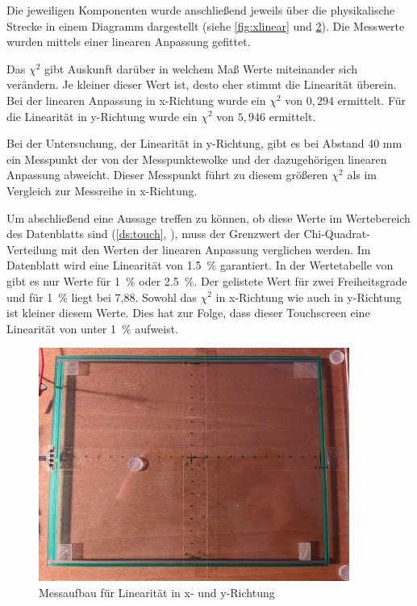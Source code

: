 Die jeweiligen Komponenten wurde anschließend jeweils über die physikalische Strecke in einem Diagramm dargestellt (siehe \cref{fig:xlinear} und \cref{fig:ylinear}).
Die Messwerte wurden mittels einer linearen Anpassung gefittet.

Das \(\chi^2\) gibt Auskunft darüber in welchem Maß Werte miteinander sich verändern.
Je kleiner dieser Wert ist, desto eher stimmt die Linearität überein.
Bei der linearen Anpassung in x-Richtung wurde ein \(\chi^2\) von \(0,294\) ermittelt.
Für die Linearität in y-Richtung wurde ein \(\chi^2\) von \(5,946\) ermittelt.

Bei der Untersuchung, der Linearität in y-Richtung, gibt es bei Abstand 40 mm ein Messpunkt der von der Messpunktewolke und der dazugehörigen linearen Anpassung abweicht. Dieser Messpunkt führt zu diesem größeren \(\chi^2\) als im Vergleich zur Messreihe  in x-Richtung.

Um abschließend eine Aussage treffen zu können, ob diese Werte im Wertebereich des Datenblatts sind (\cref{ds:touch}, ), muss der Grenzwert der Chi-Quadrat-Verteilung mit den Werten der linearen Anpassung verglichen werden.
Im Datenblatt wird eine Linearität von \SI{1,5}{\%} garantiert.
In der Wertetabelle von \cite{papula} gibt es nur Werte für \SI{1}{\%} oder \SI{2,5}{\%}.
Der gelistete Wert für zwei Freiheitsgrade und für \SI{1}{\%} liegt bei 7,88.
Sowohl das \(\chi^2\) in x-Richtung wie auch in y-Richtung ist kleiner diesem Werte.
Dies hat zur Folge, dass dieser Touchscreen eine Linearität von unter \SI{1}{\%} aufweist.
\begin{figure}[ht!]
    \centering
    \includegraphics[width=0.6\linewidth]{fig/raster/messlinear.jpg}
    \caption{Messaufbau für Linearität in x- und y-Richtung}
    \label{fig:messlinear}
\end{figure}

\begin{figure}[ht!]
    \centering
    \caption{}
    \label{fig:xlinear}
    \caption{}
    \label{fig:ylinear}
\end{figure}

